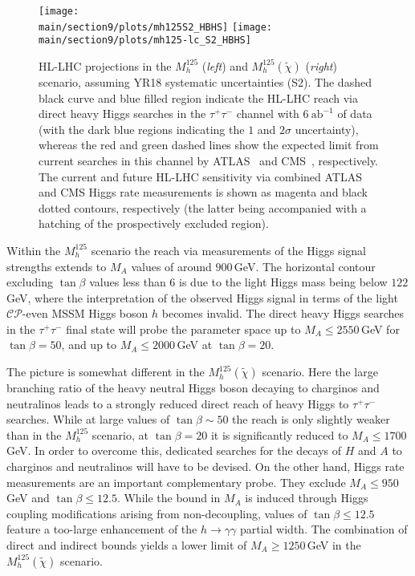 \begin{figure}
\begin{center}
\texttt{[image: \\main/section9/plots/mh125S2\_HBHS]}\hfill
\texttt{[image: \\main/section9/plots/mh125-lc\_S2\_HBHS]}
\end{center}
\caption{HL-LHC projections in the $M_h^{125}$ (\emph{left}) and
  $M_h^{125}(\tilde{\chi})$ (\emph{right}) scenario, assuming YR18 systematic uncertainties (S2). The dashed black curve and blue filled region indicate the HL-LHC reach via direct heavy Higgs searches in the $\tau^+\tau^-$ channel with $6~\mathrm{ab}^{-1}$ of data (with the dark blue regions indicating the $1$ and $2\sigma$ uncertainty), whereas 
  the red and green dashed lines show the expected limit from current searches in this channel by ATLAS~\cite{Aaboud:2017sjh} and CMS~\cite{Sirunyan:2018zut}, respectively. The current and future HL-LHC sensitivity via  combined ATLAS and CMS Higgs rate measurements is shown as magenta and black dotted contours, respectively (the latter being accompanied with a hatching of the prospectively excluded region).}
\label{fig:bench}
\end{figure}

Within the $M_h^{125}$ scenario the reach via measurements of the Higgs signal strengths extends to $M_A$ values of around $900$\,GeV. The horizontal contour excluding $\tan\beta$ values less than 6 is due to the light Higgs mass being below $122$\,GeV, where the interpretation of the observed Higgs signal in terms of the light $\mathcal{CP}$-even MSSM Higgs boson $h$ becomes invalid. The direct heavy Higgs searches in the $\tau^+\tau^-$ final state will probe the parameter space up to $M_A \le 2550$\,GeV for $\tan\beta = 50$, and up to $M_A \le 2000$\,GeV at $\tan\beta = 20$. 

The picture is somewhat different in the $M_h^{125}(\tilde{\chi})$ scenario. Here the large branching ratio of the heavy neutral Higgs boson decaying to charginos and neutralinos leads to a strongly reduced direct reach of heavy Higgs to $\tau^+\tau^-$ searches. While at large values of $\tan\beta \sim 50$  the reach is only slightly weaker than in the $M_h^{125}$ scenario, at $\tan\beta = 20$ it is significantly reduced to $M_A \le 1700$\,GeV. In order to overcome this, dedicated searches for the decays of $H$ and $A$ to charginos and neutralinos will have to be devised. On the other hand, Higgs rate measurements are an important complementary probe. They exclude
$M_A \le 950$\,GeV and $\tan\beta \le 12.5$. While the bound in $M_A$
is induced through Higgs coupling modifications arising from
non-decoupling, values of $\tan\beta\le 12.5$ feature a too-large enhancement of the $h\to \gamma\gamma$ partial width. The combination of direct and indirect bounds yields
a lower limit of $M_A \ge 1250$\,GeV in the $M_h^{125}(\tilde{\chi})$ scenario.

